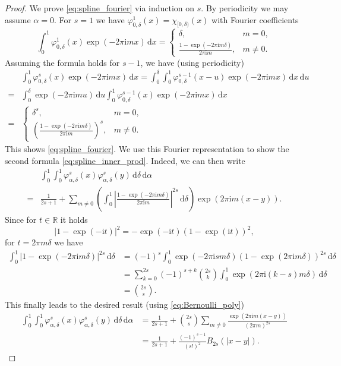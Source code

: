 \documentclass[a4paper,12pt]{article}
\numberwithin{equation}{section}
\theoremstyle{definition}
\newcommand{\bbR}{\mathbb{R}}
\newcommand{\iu}{\mathrm{i}}
\newcommand{\dx}{\text{d}}
\begin{document}
\begin{proof}
	We prove \eqref{eq:spline_fourier} via induction on $s$. By periodicity we may assume $\alpha = 0$. For $s = 1$ we have $\varphi_{0, \delta}^1(x) = \chi^{}_{[0, \delta)}(x)$ with Fourier coefficients
	$$
	\int_0^1 \varphi_{0, \delta}^1(x) \exp(-2\pi\iu m x) \, \dx x = \begin{cases}
		\delta, & m = 0, \\
		\frac{1-\exp(-2\pi\iu m \delta)}{2\pi\iu m}, & m \neq 0.
	\end{cases}
	$$
	Assuming the formula holds for $s-1$, we have (using periodicity)
	\begin{align*}
		& \int_0^1 \varphi_{0, \delta}^s(x) \exp(-2\pi\iu m x) \, \dx x = \int_0^\delta \int_0^1 \varphi_{0, \delta}^{s-1}(x-u) \exp(-2\pi\iu m x) \, \dx x \, \dx u \\
		= & \int_0^\delta \exp(-2\pi\iu m u) \, \dx u \int_0^1 \varphi_{0, \delta}^{s-1}(x) \exp(-2\pi\iu m x) \, \dx x \\
		= & \begin{cases}
			\delta^s, & m = 0, \\
			\left(\frac{1-\exp(-2\pi\iu m \delta)}{2\pi\iu m}\right)^s, & m \neq 0.
		\end{cases}
	\end{align*}
	This shows \eqref{eq:spline_fourier}. We use this Fourier representation to show the second formula \eqref{eq:spline_inner_prod}. Indeed, we can then write
	\begin{align*}
		& \int_0^1 \int_0^1 \varphi_{\alpha, \delta}^s(x) \varphi_{\alpha, \delta}^s(y) \, \dx \delta \, \dx \alpha \\
		= & \frac1{2s+1} + \sum_{m \neq 0} \left( \int_0^1 \left|\frac{1-\exp(-2\pi\iu m \delta)}{2\pi\iu m}\right|^{2s} \, \dx \delta\right) \exp(2\pi\iu m (x-y)).
	\end{align*}
	Since for $t \in \bbR$ it holds
	$$
	|1- \exp(-\iu t)|^{2} = -\exp(-\iu t) (1-\exp(\iu t))^2,
	$$
	for $t = 2\pi m \delta$ we have
	\begin{align*}
		\int_0^1 |1- \exp(-2\pi\iu m \delta)|^{2s} \, \dx \delta & = (-1)^s \int_0^1 \exp(-2\pi\iu s m \delta) (1-\exp(2\pi\iu m \delta))^{2s} \, \dx \delta \\
		& = \sum_{k=0}^{2s} (-1)^{s+k} {2s \choose k} \int_0^1 \exp(2\pi\iu (k-s) m \delta) \, \dx \delta \\
		& = {2s \choose s}.
	\end{align*}
	This finally leads to the desired result (using \eqref{eq:Bernoulli_poly})
	\begin{align*}
		\int_0^1 \int_0^1 \varphi_{\alpha, \delta}^s(x) \varphi_{\alpha, \delta}^s(y) \, \dx \delta \, \dx \alpha & = \frac1{2s+1} + {2s \choose s} \sum_{m \neq 0} \frac{\exp(2\pi\iu m (x-y))}{(2\pi m)^{2s}} \\
		& = \frac1{2s+1} + \frac{(-1)^{s-1}}{(s!)^2} B_{2s}(|x-y|).
	\end{align*}
\end{proof}
\end{document}
